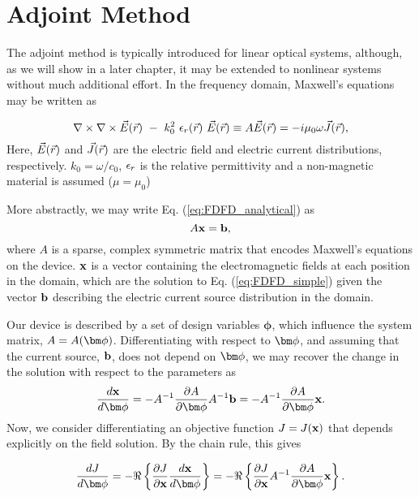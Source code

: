 \section{Adjoint Method}

The adjoint method is typically introduced for linear optical systems, although, as we will show in a later chapter, it may be extended to nonlinear systems without much additional effort.
In the frequency domain, Maxwell's equations may be written as

\begin{equation}
\dcurl \vE (\vr)\ -\ k_0^2\ \eps_r(\vr)\ \vE(\vr) \equiv A\vE(\vr) = -i\mu_0\omega\vJ(\vr),
\label{eq:FDFD_analytical}
\end{equation}
%
Here, $\vec{E}(\vec{r})$ and $\vec{J}(\vec{r})$ are the electric field and electric current distributions, respectively. $k_0 = \omega/c_0$, $\epsilon_r$ is the relative permittivity and a non-magnetic material is assumed ($\mu = \mu_0$)

More abstractly, we may write Eq. (\ref{eq:FDFD_analytical}) as
%
\begin{equation}
A \mathbf{x} = \mathbf{b},
\label{eq:FDFD_simple}
\end{equation}
%
where $A$ is a sparse, complex symmetric matrix that encodes Maxwell's equations on the device.  
$\mathbf{x}$ is a vector containing the electromagnetic fields at each position in the domain, which are the solution to Eq. (\ref{eq:FDFD_simple}) given the vector $\mathbf{b}$ describing the electric current source distribution in the domain.

Our device is described by a set of design variables $\bm{\phi}$, which influence the system matrix, $A = A(\bfphi)$.
Differentiating  with respect to $\bfphi$, and assuming that the current source, $\mathbf{b}$, does not depend on $\bfphi$, we may recover the change in the solution with respect to the parameters as
%
\begin{equation}
\dfrac{\bfx}{\bfphi} = -\invA \pfrac{A}{\bfphi} \invA \bfb = -\invA \pfrac{A}{\bfphi}\bfx
\label{eq:dEdgamma}.
\end{equation}
%
Now, we consider differentiating an objective function $J = J(\mathbf{x})$ that depends explicitly on the field solution.
By the chain rule, this gives

\begin{equation}
\dfrac{J}{\bfphi} =  - \real{ \pfrac{J}{\bfx} \dfrac{\bfx}{\bfphi} } = - \real{ \pfrac{J}{\bfx} A^{-1} \pfrac{A}{\bfphi} \bfx }
\label{eq:dGdgamma_2}.
\end{equation}

